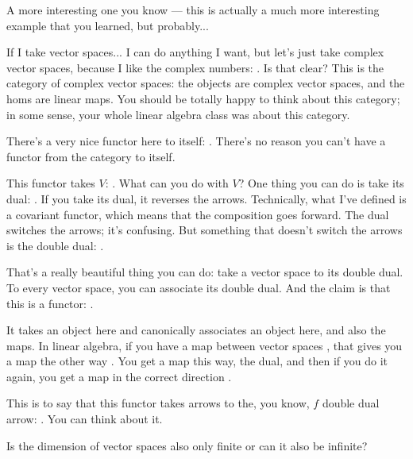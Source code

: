 \begin{speech}[01:27:44 - 01:30:03]
A more interesting one you know --- this is actually a much more interesting example that you learned, but probably...

If I take vector spaces... I can do anything I want, but let's just take complex vector spaces, because I like the complex numbers: . Is that clear? This is the category of complex vector spaces: the objects are complex vector spaces, and the homs are linear maps. You should be totally happy to think about this category; in some sense, your whole linear algebra class was about this category.

There's a very nice functor here to itself: . There's no reason you can't have a functor from the category to itself.

This functor takes $V$: . What can you do with $V$? One thing you can do is take its dual: . If you take its dual, it reverses the arrows. Technically, what I've defined is a covariant functor, which means that the composition goes forward. The dual switches the arrows; it's confusing. But something that doesn't switch the arrows is the double dual: .

That's a really beautiful thing you can do: take a vector space to its double dual. To every vector space, you can associate its double dual. And the claim is that this is a functor: .

It takes an object here and canonically associates an object here, and also the maps. In linear algebra, if you have a map between vector spaces , that gives you a map the other way . You get a map this way, the dual, and then if you do it again, you get a map in the correct direction .

This is to say that this functor takes arrows to the, you know, $f$ double dual arrow: . You can think about it.
\end{speech}

\begin{student}
Is the dimension of vector spaces also only finite or can it also be infinite?
\end{student}

